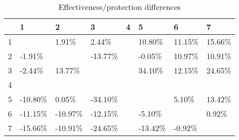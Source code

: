 \begin{table}[ht]
\centering
\begin{tabular}{rlllllll}
  \hline
 & 1 & 2 & 3 & 4 & 5 & 6 & 7 \\ 
  \hline
1 &  & 1.91\% & 2.44\% &  & 10.80\% & 11.15\% & 15.66\% \\ 
  2 & -1.91\% &  & -13.77\% &  & -0.05\% & 10.97\% & 10.91\% \\ 
  3 & -2.44\% & 13.77\% &  &  & 34.10\% & 12.15\% & 24.65\% \\ 
  4 &  &  &  &  &  &  &  \\ 
  5 & -10.80\% & 0.05\% & -34.10\% &  &  & 5.10\% & 13.42\% \\ 
  6 & -11.15\% & -10.97\% & -12.15\% &  & -5.10\% &  & 0.92\% \\ 
  7 & -15.66\% & -10.91\% & -24.65\% &  & -13.42\% & -0.92\% &  \\ 
   \hline
\end{tabular}
\caption{Effectiveness/protection differences} 
\end{table}

